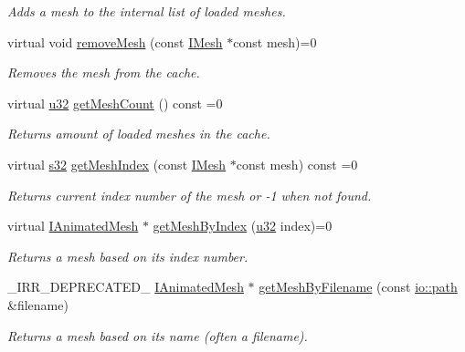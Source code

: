 \begin{DoxyCompactItemize}
\begin{DoxyCompactList}\small\item\em Adds a mesh to the internal list of loaded meshes. \end{DoxyCompactList}\item 
virtual void \hyperlink{classirr_1_1scene_1_1IMeshCache_aa82078b06fdcaa332b44a59e4027f921}{remove\+Mesh} (const \hyperlink{classirr_1_1scene_1_1IMesh}{I\+Mesh} $\ast$const mesh)=0
\begin{DoxyCompactList}\small\item\em Removes the mesh from the cache. \end{DoxyCompactList}\item 
virtual \hyperlink{namespaceirr_a0416a53257075833e7002efd0a18e804}{u32} \hyperlink{classirr_1_1scene_1_1IMeshCache_a9dc99e46309a6ef494ef7672c9b49853}{get\+Mesh\+Count} () const =0
\begin{DoxyCompactList}\small\item\em Returns amount of loaded meshes in the cache. \end{DoxyCompactList}\item 
virtual \hyperlink{namespaceirr_ac66849b7a6ed16e30ebede579f9b47c6}{s32} \hyperlink{classirr_1_1scene_1_1IMeshCache_a2b3512bd3ff11d0b290fa5d2d580eb54}{get\+Mesh\+Index} (const \hyperlink{classirr_1_1scene_1_1IMesh}{I\+Mesh} $\ast$const mesh) const =0
\begin{DoxyCompactList}\small\item\em Returns current index number of the mesh or -\/1 when not found. \end{DoxyCompactList}\item 
virtual \hyperlink{classirr_1_1scene_1_1IAnimatedMesh}{I\+Animated\+Mesh} $\ast$ \hyperlink{classirr_1_1scene_1_1IMeshCache_a06e7755013445f9bc3d7339fbd009e31}{get\+Mesh\+By\+Index} (\hyperlink{namespaceirr_a0416a53257075833e7002efd0a18e804}{u32} index)=0
\begin{DoxyCompactList}\small\item\em Returns a mesh based on its index number. \end{DoxyCompactList}\item 
\+\_\+\+I\+R\+R\+\_\+\+D\+E\+P\+R\+E\+C\+A\+T\+E\+D\+\_\+ \hyperlink{classirr_1_1scene_1_1IAnimatedMesh}{I\+Animated\+Mesh} $\ast$ \hyperlink{classirr_1_1scene_1_1IMeshCache_aa3946324e39cc074b1f73e01d57cae70}{get\+Mesh\+By\+Filename} (const \hyperlink{namespaceirr_1_1io_a6468281622ce3a1c46b72e19f32dded5}{io\+::path} \&filename)
\begin{DoxyCompactList}\small\item\em Returns a mesh based on its name (often a filename). \end{DoxyCompactList}\item 

\end{DoxyCompactItemize}

